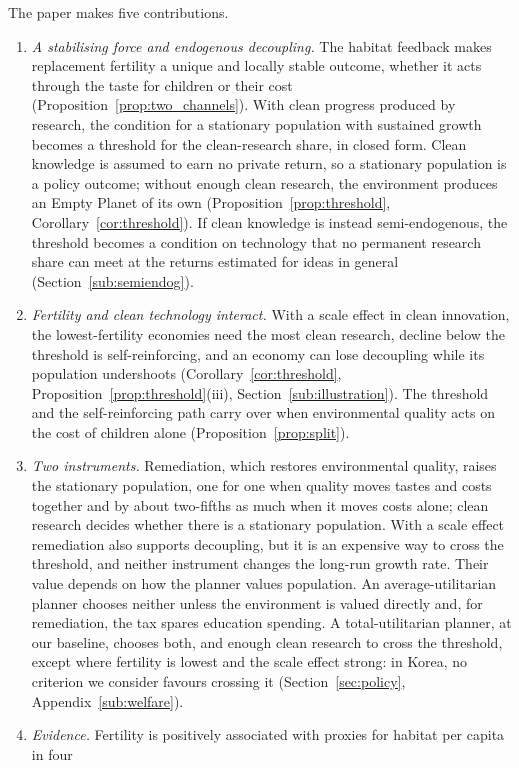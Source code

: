 \documentclass[11pt]{article}
\begin{document}
The paper makes five contributions.
\begin{enumerate}
\item \emph{A stabilising force and endogenous decoupling.} The habitat feedback makes replacement
fertility a unique and locally stable outcome, whether it acts through the taste for children or their
cost (Proposition~\ref{prop:two_channels}). With clean progress produced by research, the condition for
a stationary population with sustained growth becomes a threshold for the clean-research share, in
closed form. Clean knowledge is assumed to earn no private return, so a stationary population is a
policy outcome; without enough clean research, the environment produces an Empty Planet of its own
(Proposition~\ref{prop:threshold}, Corollary~\ref{cor:threshold}). If clean knowledge is instead
semi-endogenous, the threshold becomes a condition on technology that no permanent research share can
meet at the returns estimated for ideas in general (Section~\ref{sub:semiendog}).
\item \emph{Fertility and clean technology interact.} With a scale effect in clean innovation, the
lowest-fertility economies need the most clean research, decline below the threshold is
self-reinforcing, and an economy can lose decoupling while its population undershoots
(Corollary~\ref{cor:threshold}, Proposition~\ref{prop:threshold}(iii), Section~\ref{sub:illustration}).
The threshold and the self-reinforcing path carry over when environmental quality acts on the cost of
children alone (Proposition~\ref{prop:split}).
\item \emph{Two instruments.} Remediation, which restores environmental quality, raises the stationary
population, one for one when quality moves tastes and costs together and by about two-fifths as much when
it moves costs alone; clean research decides whether there is a stationary population. With a scale
effect remediation also supports decoupling, but it is an expensive way to cross the threshold, and
neither instrument changes the long-run growth rate. Their value depends on how the planner values
population. An average-utilitarian planner chooses neither unless the environment is valued directly
and, for remediation, the tax spares education spending. A
total-utilitarian planner, at our baseline, chooses both, and enough clean research to cross the
threshold, except where fertility is lowest and the scale effect strong: in Korea, no criterion we
consider favours crossing it (Section~\ref{sec:policy}, Appendix~\ref{sub:welfare}).
\item \emph{Evidence.} Fertility is positively associated with proxies for habitat per capita in four

\end{enumerate}
\end{document}
